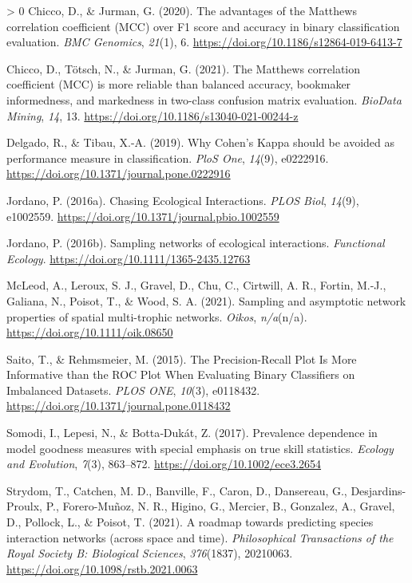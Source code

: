 \documentclass[11pt]{article}
\newlength{\cslhangindent}
\newenvironment{CSLReferences}[3] %
 {%
  \setlength{\parindent}{0pt}
  \ifodd #1 \everypar{\setlength{\hangindent}{\cslhangindent}}\ignorespaces\fi
  \ifnum #2 > 0
  \setlength{\parskip}{#2\baselineskip}
  \fi
 }%
 {}
\begin{document}
\begin{CSLReferences}{1}{0}
\leavevmode\hypertarget{ref-Chicco2020AdvMat}{}%
Chicco, D., \& Jurman, G. (2020). The advantages of the Matthews
correlation coefficient (MCC) over F1 score and accuracy in binary
classification evaluation. \emph{BMC Genomics}, \emph{21}(1), 6.
\url{https://doi.org/10.1186/s12864-019-6413-7}

\leavevmode\hypertarget{ref-Chicco2021MatCor}{}%
Chicco, D., Tötsch, N., \& Jurman, G. (2021). The Matthews correlation
coefficient (MCC) is more reliable than balanced accuracy, bookmaker
informedness, and markedness in two-class confusion matrix evaluation.
\emph{BioData Mining}, \emph{14}, 13.
\url{https://doi.org/10.1186/s13040-021-00244-z}

\leavevmode\hypertarget{ref-Delgado2019WhyCoh}{}%
Delgado, R., \& Tibau, X.-A. (2019). Why Cohen's Kappa should be avoided
as performance measure in classification. \emph{PloS One}, \emph{14}(9),
e0222916. \url{https://doi.org/10.1371/journal.pone.0222916}

\leavevmode\hypertarget{ref-Jordano2016ChaEco}{}%
Jordano, P. (2016a). Chasing Ecological Interactions. \emph{PLOS Biol},
\emph{14}(9), e1002559.
\url{https://doi.org/10.1371/journal.pbio.1002559}

\leavevmode\hypertarget{ref-Jordano2016SamNet}{}%
Jordano, P. (2016b). Sampling networks of ecological interactions.
\emph{Functional Ecology}. \url{https://doi.org/10.1111/1365-2435.12763}

\leavevmode\hypertarget{ref-McLeod2021SamAsy}{}%
McLeod, A., Leroux, S. J., Gravel, D., Chu, C., Cirtwill, A. R., Fortin,
M.-J., Galiana, N., Poisot, T., \& Wood, S. A. (2021). Sampling and
asymptotic network properties of spatial multi-trophic networks.
\emph{Oikos}, \emph{n/a}(n/a). \url{https://doi.org/10.1111/oik.08650}

\leavevmode\hypertarget{ref-Saito2015PrePlo}{}%
Saito, T., \& Rehmsmeier, M. (2015). The Precision-Recall Plot Is More
Informative than the ROC Plot When Evaluating Binary Classifiers on
Imbalanced Datasets. \emph{PLOS ONE}, \emph{10}(3), e0118432.
\url{https://doi.org/10.1371/journal.pone.0118432}

\leavevmode\hypertarget{ref-Somodi2017PreDep}{}%
Somodi, I., Lepesi, N., \& Botta‐Dukát, Z. (2017). Prevalence dependence
in model goodness measures with special emphasis on true skill
statistics. \emph{Ecology and Evolution}, \emph{7}(3), 863--872.
\url{https://doi.org/10.1002/ece3.2654}

\leavevmode\hypertarget{ref-Strydom2021RoaPre}{}%
Strydom, T., Catchen, M. D., Banville, F., Caron, D., Dansereau, G.,
Desjardins-Proulx, P., Forero-Muñoz, N. R., Higino, G., Mercier, B.,
Gonzalez, A., Gravel, D., Pollock, L., \& Poisot, T. (2021). A roadmap
towards predicting species interaction networks (across space and time).
\emph{Philosophical Transactions of the Royal Society B: Biological
Sciences}, \emph{376}(1837), 20210063.
\url{https://doi.org/10.1098/rstb.2021.0063}


\end{CSLReferences}
\end{document}
